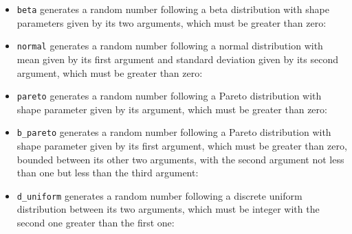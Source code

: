 \begin{itemize}
\item {\tt beta} generates a random number following a beta distribution with shape parameters given by its
two arguments, which must be greater than zero:

\item {\tt normal} generates a random number following a normal distribution with mean given by its first
argument and standard deviation given by its second argument, which must be greater than zero:

\item {\tt pareto} generates a random number following a Pareto distribution with shape parameter given by
its argument, which must be greater than zero:

\item {\tt b\_pareto} generates a random number following a Pareto distribution with shape parameter given
by its first argument, which must be greater than zero, bounded between its other two arguments, with the
second argument not less than one but less than the third argument:

\item {\tt d\_uniform} generates a random number following a discrete uniform distribution between its two
arguments, which must be integer with the second one greater than the first one:


\end{itemize}
